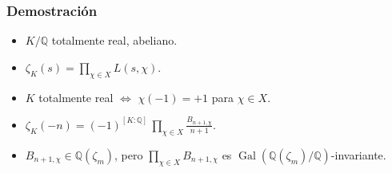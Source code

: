 \documentclass[handout]{beamer}
\newcommand{\QQ}{\mathbb{Q}}
\DeclareMathOperator{\Gal}{Gal}
\begin{document}

\begin{frame}
  \frametitle{Demostración}

  \begin{itemize}
  \item<1-> $K/\QQ$ totalmente real, abeliano.

  \item<2-> $\zeta_K (s) = \prod_{\chi\in X} L (s,\chi)$.

  \item<3-> $K$ totalmente real $\iff$ $\chi (-1) = +1$ para $\chi \in X$.

  \item<4-> $\zeta_K (-n) = (-1)^{[K:\QQ]}\,\prod_{\chi \in X} \frac{B_{n+1,\chi}}{n+1}$.

  \item<5-> $B_{n+1,\chi} \in \QQ (\zeta_m)$, pero
    $\prod_{\chi\in X} B_{n+1,\chi}$ es $\Gal (\QQ (\zeta_m)/\QQ)$-invariante.
  \end{itemize}
\end{frame}

\end{document}
